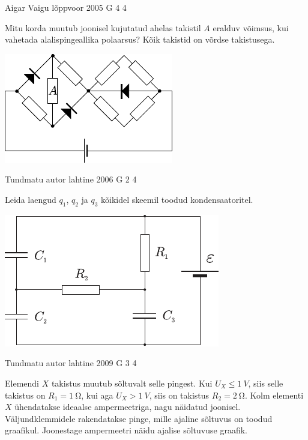 \documentclass[11pt, twoside]{article}
\begin{document}
{%
{Aigar Vaigu} %
{lõppvoor} %
{2005} %
{G 4} %
{4} %
{
\ifStatement
Mitu korda muutub joonisel kujutatud ahelas takistil $A$ eralduv võimsus, kui vahetada alalispingeallika polaarsus? Kõik takistid on võrdse takistusega.

\begin{center}
	\includegraphics[width=0.6\linewidth]{2005-v3g-04-yl}
\end{center}
\fi
}

{Tundmatu autor} %
{lahtine} %
{2006} %
{G 2} %
{4} %
{
\ifStatement
Leida laengud $q_1$, $q_2$ ja $q_3$ kõikidel skeemil toodud kondensaatoritel.

\begin{center}
	\includegraphics[width=0.7\linewidth]{2006-lahg-02-yl}
\end{center}
\fi
}

{Tundmatu autor} %
{lahtine} %
{2009} %
{G 3} %
{4} %
{
\ifStatement
Elemendi $X$ takistus muutub sõltuvalt selle pingest. Kui $U_X \leq \SI{1}{V}$,
siis selle takistus on $R_1 = \SI{1}{\ohm}$, kui aga $U_X > \SI{1}{V}$, siis on takistus $R_2 =
\SI{2}{\ohm}$. Kolm elementi $X$ ühendatakse ideaalse ampermeetriga, nagu näidatud joonisel.
Väljundklemmidele rakendatakse pinge, mille ajaline sõltuvus on toodud graafikul.
Joonestage ampermeetri näidu ajalise sõltuvuse graafik.

}}
\end{document}
